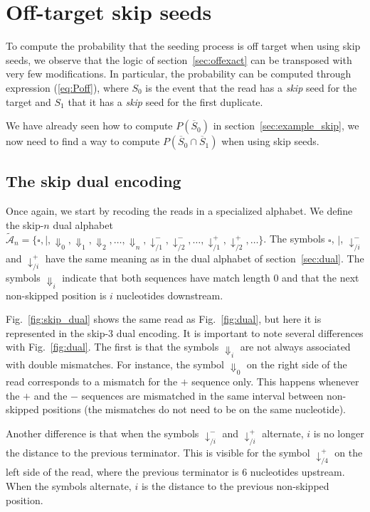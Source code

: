 \documentclass{article}
\begin{document}
\section{Off-target skip seeds}

To compute the probability that the seeding process is off target when
using skip seeds, we observe that the logic of section~\ref{sec:offexact}
can be transposed with very few modifications. In particular, the
probability can be computed through expression (\ref{eq:Poff}), where
$S_0$ is the event that the read has a \emph{skip} seed for the target and
$S_1$ that it has a \emph{skip} seed for the first duplicate.

We have already seen how to compute $P(\overline{S}_0)$ in
section~\ref{sec:example_skip}, we now need to find a way to compute
$P(\overline{S}_0 \cap \overline{S}_1)$ when using skip seeds.

\subsection{The skip dual encoding}

Once again, we start by recoding the reads in a specialized alphabet. We
define the skip-$n$ dual alphabet $\tilde{\mathcal{A}}_n = \{\square, |,
\Downarrow_0, \Downarrow_1, \Downarrow_2, \ldots, \Downarrow_n,
\downarrow^-_{/1}, \downarrow^-_{/2}, \ldots, \downarrow^+_{/1},
\downarrow^+_{/2}, \ldots\}$. The symbols $\square$, $|$,
$\downarrow^-_{/i}$ and $\downarrow^+_{/i}$ have the same meaning as in
the dual alphabet of section~\ref{sec:dual}. The symbols $\Downarrow_i$
indicate that both sequences have match length 0 and that the next
non-skipped position is $i$ nucleotides downstream.

Fig.~\ref{fig:skip_dual} shows the same read as Fig.~\ref{fig:dual}, but
here it is represented in the skip-3 dual encoding. It is important to
note several differences with Fig.~\ref{fig:dual}. The first is that the
symbols $\Downarrow_i$ are not always associated with double mismatches.
For instance, the symbol $\Downarrow_0$ on the right side of the read
corresponds to a mismatch for the $+$ sequence only. This happens whenever
the $+$ and the $-$ sequences are mismatched in the same interval between
non-skipped positions (the mismatches do not need to be on the same
nucleotide).

Another difference is that when the symbols $\downarrow^-_{/i}$ and
$\downarrow^+_{/i}$ alternate, $i$ is no longer the distance to the
previous terminator. This is visible for the symbol $\downarrow^+_{/4}$ on
the left side of the read, where the previous terminator is 6 nucleotides
upstream. When the symbols alternate, $i$ is the distance to the previous
non-skipped position.
\end{document}
